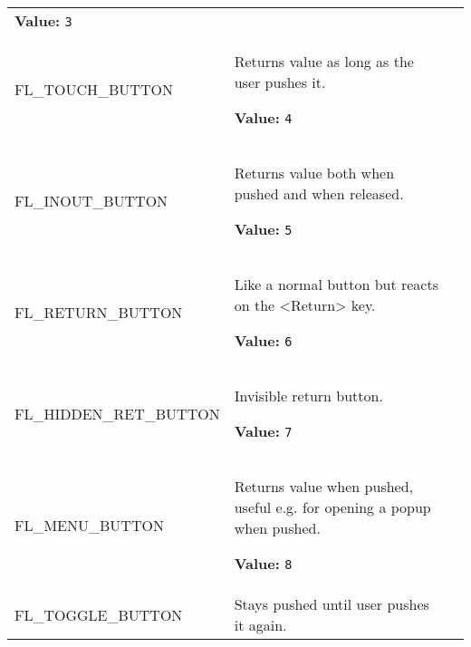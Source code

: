 \begin{longtable}{|p{\varnamewidth}|p{\vardescrwidth}|l}
\textbf{Value:} 
{\tt 3}&\\
\cline{1-2}
\raggedright F\-L\-\_\-T\-O\-U\-C\-H\-\_\-B\-U\-T\-T\-O\-N\- & \raggedright Returns value as long as the user pushes it.

\textbf{Value:} 
{\tt 4}&\\
\cline{1-2}
\raggedright F\-L\-\_\-I\-N\-O\-U\-T\-\_\-B\-U\-T\-T\-O\-N\- & \raggedright Returns value both when pushed and when released.

\textbf{Value:} 
{\tt 5}&\\
\cline{1-2}
\raggedright F\-L\-\_\-R\-E\-T\-U\-R\-N\-\_\-B\-U\-T\-T\-O\-N\- & \raggedright Like a normal button but reacts on the <Return> key.

\textbf{Value:} 
{\tt 6}&\\
\cline{1-2}
\raggedright F\-L\-\_\-H\-I\-D\-D\-E\-N\-\_\-R\-E\-T\-\_\-B\-U\-T\-T\-O\-N\- & \raggedright Invisible return button.

\textbf{Value:} 
{\tt 7}&\\
\cline{1-2}
\raggedright F\-L\-\_\-M\-E\-N\-U\-\_\-B\-U\-T\-T\-O\-N\- & \raggedright Returns value when pushed, useful e.g. for opening a popup when pushed.

\textbf{Value:} 
{\tt 8}&\\
\cline{1-2}
\raggedright F\-L\-\_\-T\-O\-G\-G\-L\-E\-\_\-B\-U\-T\-T\-O\-N\- & \raggedright Stays pushed until user pushes it again.


\end{longtable}

